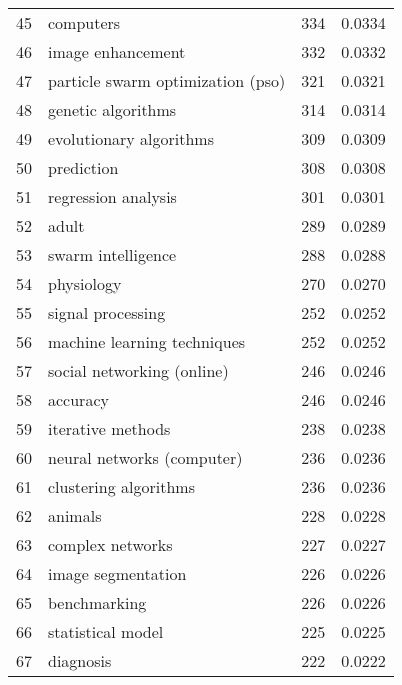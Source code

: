 \begin{tabular}{llrr}
45 &                                computers &         334 &      0.0334 \\
46 &                        image enhancement &         332 &      0.0332 \\
47 &        particle swarm optimization (pso) &         321 &      0.0321 \\
48 &                       genetic algorithms &         314 &      0.0314 \\
49 &                  evolutionary algorithms &         309 &      0.0309 \\
50 &                               prediction &         308 &      0.0308 \\
51 &                      regression analysis &         301 &      0.0301 \\
52 &                                    adult &         289 &      0.0289 \\
53 &                       swarm intelligence &         288 &      0.0288 \\
54 &                               physiology &         270 &      0.0270 \\
55 &                        signal processing &         252 &      0.0252 \\
56 &              machine learning techniques &         252 &      0.0252 \\
57 &               social networking (online) &         246 &      0.0246 \\
58 &                                 accuracy &         246 &      0.0246 \\
59 &                        iterative methods &         238 &      0.0238 \\
60 &               neural networks (computer) &         236 &      0.0236 \\
61 &                    clustering algorithms &         236 &      0.0236 \\
62 &                                  animals &         228 &      0.0228 \\
63 &                         complex networks &         227 &      0.0227 \\
64 &                       image segmentation &         226 &      0.0226 \\
65 &                             benchmarking &         226 &      0.0226 \\
66 &                        statistical model &         225 &      0.0225 \\
67 &                                diagnosis &         222 &      0.0222 \\

\end{tabular}
